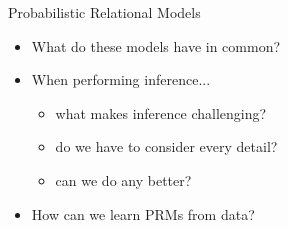 \documentclass{beamer}
\begin{document}
\begin{frame}{Probabilistic Relational Models}
  \begin{itemize}
  \item What do these models have in common?
  \item When performing inference...
    \begin{itemize}
    \item what makes inference challenging?
    \item do we have to consider every detail?
    \item can we do any better?
    \end{itemize}
  \item How can we learn PRMs from data?
  \end{itemize}
\end{frame}
\end{document}
